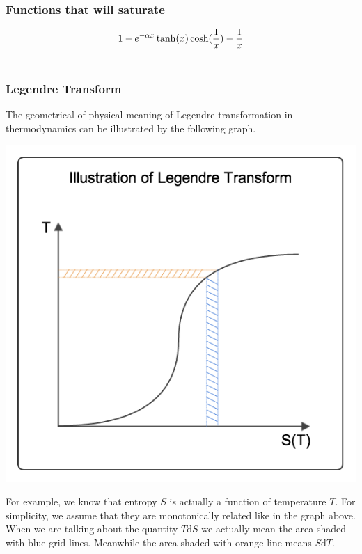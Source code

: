 \documentclass[letterpaper,10pt,english]{sphinxmanual}
\begin{document}
\subsubsection{Functions that will saturate}
\label{vocabulary/vocabulary:functions-that-will-saturate}\begin{gather}
\begin{split}1-e^{-\alpha x}
\tanh(x)
\cosh(\frac{1}{x}) - \frac{1}{x}\end{split}\notag\\\begin{split}\end{split}\notag
\end{gather}

\subsubsection{Legendre Transform}
\label{vocabulary/vocabulary:legendre-transform}
The geometrical of physical meaning of Legendre transformation in thermodynamics can be illustrated by the following graph.

\includegraphics[width=0.800\linewidth]{LegendreTransform.png}

For example, we know that entropy $S$ is actually a function of temperature $T$. For simplicity, we assume that they are monotonically related like in the graph above. When we are talking about the quantity $T \mathrm d S$ we actually mean the area shaded with blue grid lines. Meanwhile the area shaded with orange line means $S \mathrm d T$.
\end{document}
